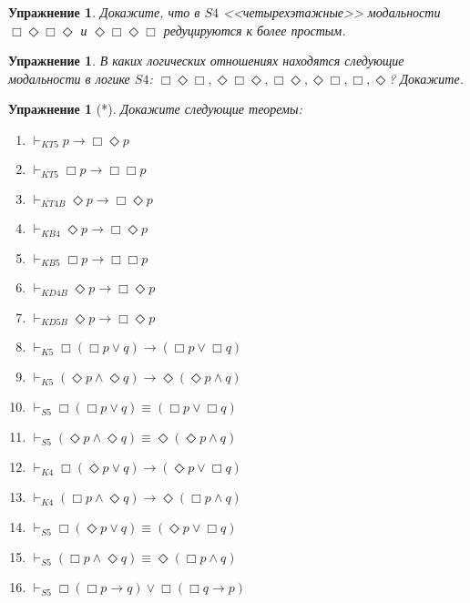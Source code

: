 \documentclass[11pt]{article}
\newtheorem{exercise}[theorem]{Упражнение}
\begin{document}
\begin{exercise}
	Докажите, что в $S4$ <<четырехэтажные>> модальности $\Box \Diamond \Box \Diamond$ и $\Diamond \Box \Diamond \Box$ редуцируются к более простым.
\end{exercise}

\begin{exercise}
	В каких логических отношениях находятся следующие модальности в логике $S4$: $\Box \Diamond \Box, \Diamond \Box \Diamond, \Box \Diamond, \Diamond \Box, \Box, \Diamond$? Докажите. 
\end{exercise}

\begin{exercise}[*] Докажите следующие теоремы:
\begin{multicols}{2}
\begin{enumerate}
	\item $\vdash_{KT5} p \to \Box \Diamond p$
	\item $\vdash_{KT5} \Box p \to \Box \Box p$
	\item $\vdash_{KT4B} \Diamond p \to \Box \Diamond p$
	\item $\vdash_{KB4} \Diamond p \to \Box \Diamond p $
	\item $\vdash_{KB5} \Box p \to \Box \Box p $
    \item $\vdash_{KD4B} \Diamond p \to \Box \Diamond p$
    \item $\vdash_{KD5B} \Diamond p \to \Box \Diamond p$
    \item $\vdash_{K5} \Box (\Box p \vee q ) \to (\Box p \vee \Box q)$
    \item $\vdash_{K5} (\Diamond p \wedge \Diamond q) \to \Diamond (\Diamond p \wedge q) $
    \item $\vdash_{S5} \Box (\Box p \vee q ) \equiv (\Box p \vee \Box q)$
    \item $\vdash_{S5} (\Diamond p \wedge \Diamond q) \equiv \Diamond (\Diamond p \wedge q) $
    \item $\vdash_{K4} \Box (\Diamond p \vee q ) \to (\Diamond p \vee \Box q)$
    \item $\vdash_{K4} (\Box p \wedge \Diamond q) \to \Diamond (\Box p \wedge q) $
    \item $\vdash_{S5} \Box (\Diamond p \vee q ) \equiv (\Diamond p \vee \Box q)$
    \item $\vdash_{S5} (\Box p \wedge \Diamond q) \equiv \Diamond (\Box p \wedge q) $
    \item $\vdash_{S5} \Box (\Box p \to q) \vee \Box (\Box q \to p)$
\end{enumerate}
\end{multicols}
\end{exercise}
\end{document}
